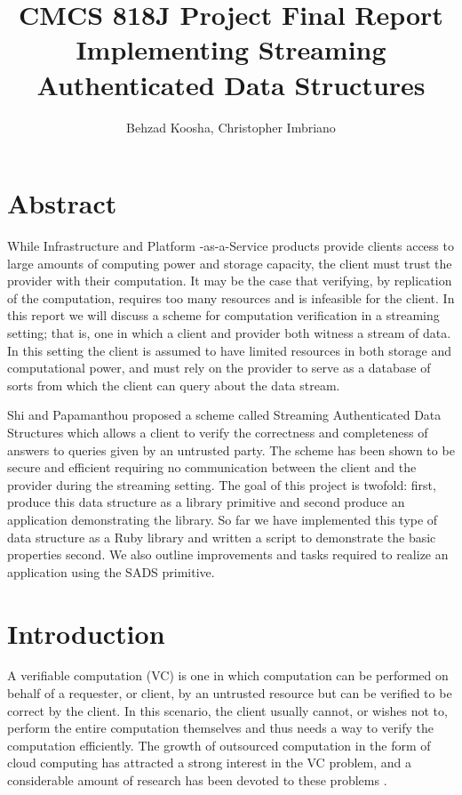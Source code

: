\documentclass[11pt, letterpaper, oneside]{article}
\begin{document}
\title{\textbf{CMCS 818J Project Final Report} \\ Implementing Streaming Authenticated Data Structures}
\author{Behzad Koosha, Christopher Imbriano}

\maketitle

\section{Abstract}

	While Infrastructure and Platform -as-a-Service products provide clients access to large amounts of computing power and storage capacity, the client must trust the provider with their computation.
	It may be the case that verifying, by replication of the computation, requires too many resources and is infeasible for the client.
	In this report we will discuss a scheme for computation verification in a streaming setting; that is, one in which a client and provider both witness a stream of data.
	In this setting the client is assumed to have limited resources in both storage and computational power, and must rely on the provider to serve as a database of sorts from which the client can query about the data stream.
	
	Shi and Papamanthou \cite{sads} proposed a scheme called Streaming Authenticated Data Structures which allows a client to verify the correctness and completeness of answers to queries given by an untrusted party.
	The scheme has been shown to be secure and efficient requiring no communication between the client and the provider during the streaming setting.
	The goal of this project is twofold: first, produce this data structure as a library primitive and second produce an application demonstrating the library.
	So far we have implemented this type of data structure as a Ruby library and written a script to demonstrate the basic properties second.
	We also outline improvements and tasks required to realize an application using the SADS primitive.


\section{Introduction}

	A verifiable computation (VC) is one in which computation can be performed on behalf of a requester, or client, by an untrusted resource but can be verified to be correct by the client.
	In this scenario, the client usually cannot, or wishes not to, perform the entire computation themselves and thus needs a way to verify the computation efficiently. 
	The growth of outsourced computation in the form of cloud computing has attracted a strong interest in the VC problem, and a considerable amount of research has been devoted to these problems \cite{evsc}.
	
\end{document}
